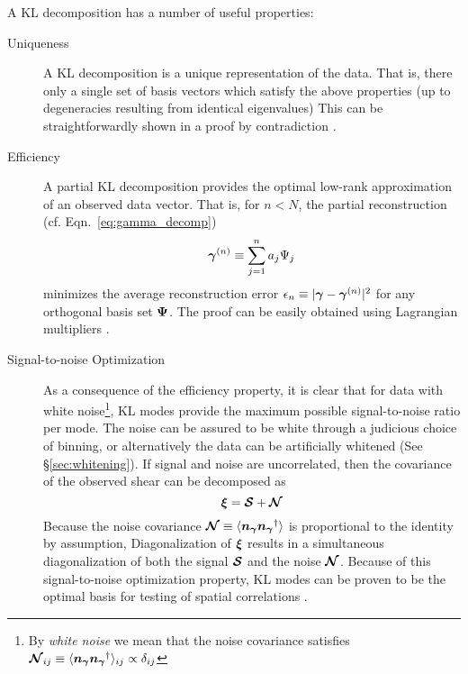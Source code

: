 A KL decomposition has a number of useful properties:
\begin{description}
  \item[Uniqueness] A KL decomposition is a unique representation of the data.
    That is, there only a single set of basis vectors which satisfy the above
    properties (up to degeneracies resulting from identical eigenvalues)
    This can be straightforwardly shown in a proof by contradiction
    \citep[e.g.][]{Vogeley96}.
  \item[Efficiency] A partial KL decomposition provides the
    optimal low-rank approximation of an observed data vector.  That is,
    for $n < N$, the partial reconstruction (cf. Eqn.~\ref{eq:gamma_decomp})
    \begin{equation}
      \boldsymbol{\gamma}^{(n)} \equiv \sum_{j=1}^n a_j \Psi_j
    \end{equation}
    minimizes the average reconstruction error
    $\epsilon_n \equiv |\boldsymbol{\gamma} - \boldsymbol{\gamma}^{(n)}|^2$
    for any orthogonal basis set $\boldsymbol{\Psi}$.  The proof can be easily
    obtained using Lagrangian multipliers \citep[again, see][]{Vogeley96}.
  \item[Signal-to-noise Optimization] As a consequence of the efficiency
    property, it is clear that for data with white noise\footnote{
    By \textit{white noise} we mean that the noise covariance satisfies
    $\boldsymbol{\mathcal{N}}_{ij} \equiv 
    \langle\boldsymbol{n_\gamma}\boldsymbol{n_\gamma}^\dagger\rangle_{ij} 
    \propto \delta_{ij}$}, KL modes provide the
    maximum possible signal-to-noise ratio per mode.  The noise can be assured
    to be white through a judicious choice of binning, or alternatively
    the data can be artificially whitened (See \S\ref{sec:whitening}).
    If signal and noise are uncorrelated, then the covariance of the observed
    shear can be decomposed as
    \begin{equation}
      \boldsymbol{\xi} = \boldsymbol{\mathcal{S}} + \boldsymbol{\mathcal{N}}
    \end{equation}
    Because the noise covariance $\boldsymbol{\mathcal{N}} \equiv 
    \langle\boldsymbol{n_\gamma}\boldsymbol{n_\gamma}^\dagger\rangle$ is proportional
    to the identity by assumption, Diagonalization of $\boldsymbol{\xi}$ results
    in a simultaneous diagonalization of both the signal $\boldsymbol{\mathcal{S}}$
    and the noise $\boldsymbol{\mathcal{N}}$.  Because of this signal-to-noise
    optimization property, KL modes can be proven to be the optimal basis
    for testing of spatial correlations \citep[see Appendix A of][]{Vogeley96}.
\end{description}

